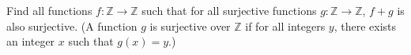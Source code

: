Find all functions $f:\mathbb Z\to \mathbb Z$ such that for all surjective functions $g:\mathbb Z\to \mathbb Z$, $f+g$ is also surjective. (A function $g$ is surjective over $\mathbb Z$ if for all integers $y$, there exists an integer $x$ such that $g(x)=y$.)

